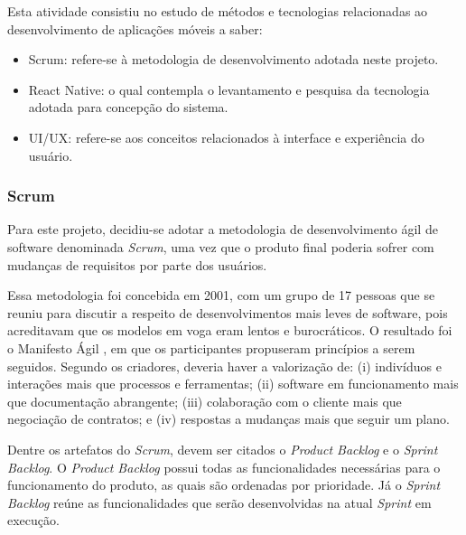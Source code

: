 Esta atividade consistiu no estudo de métodos e tecnologias relacionadas ao desenvolvimento de aplicações móveis a saber: 

\begin{itemize}

    \item Scrum: refere-se à metodologia de desenvolvimento adotada neste projeto.
  
    \item React Native: o qual contempla o levantamento e pesquisa da tecnologia adotada para concepção do sistema.
    
    \item UI/UX: refere-se aos conceitos relacionados à interface e experiência do usuário.
    
\end{itemize}


\subsubsection{Scrum} 
Para este projeto, decidiu-se adotar a metodologia de desenvolvimento ágil de software denominada \textit{Scrum}, uma vez que o produto final poderia sofrer com mudanças de requisitos por parte dos usuários. 

Essa metodologia foi concebida em 2001, com um grupo de 17 pessoas que se reuniu para discutir a respeito de desenvolvimentos mais leves de software, pois acreditavam que os modelos em voga eram lentos e burocráticos. O resultado foi o Manifesto Ágil \citep{agileManifesto}, em que os participantes propuseram princípios a serem seguidos. Segundo os criadores, deveria haver a valorização de: (i) indivíduos e interações mais que processos e ferramentas; (ii) software em funcionamento mais que documentação abrangente; (iii) colaboração com o cliente mais que negociação de contratos; e (iv) respostas a mudanças mais que seguir um plano.

Dentre os artefatos do \textit{Scrum}, devem ser citados o \textit{Product Backlog} e o \textit{Sprint Backlog}. O \textit{Product Backlog} possui todas as funcionalidades necessárias para o funcionamento do produto, as quais são ordenadas por prioridade. Já o \textit{Sprint Backlog} reúne as funcionalidades que serão desenvolvidas na atual \textit{Sprint} em execução.

